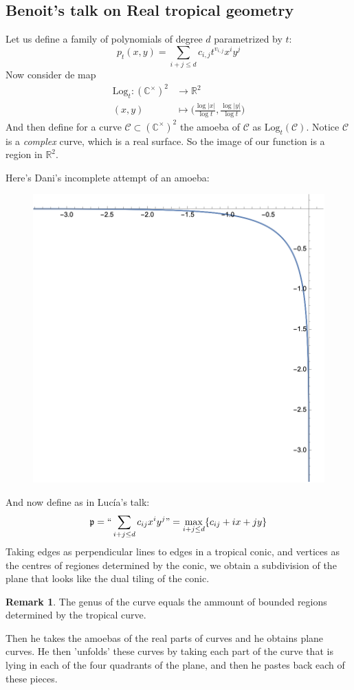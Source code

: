\documentclass{article}
\theoremstyle{definition}
\newtheorem*{obs}{Remark}
\newcommand{\R}{\mathbb{R}}
\newcommand{\C}{\mathbb{C}}
\newcommand{\Log}{\text{Log}}
\begin{document}
\newpage
\subsection{Benoit's talk on Real tropical geometry}
Let us define a family of polynomials of degree $d$ parametrized by $t$:
$$
p_t(x,y)=\sum_{i+j\leq d}c_{i,j}t^{v_{i,j}}x^iy^j
$$
Now consider de map
\begin{align*}
	\Log_t:(\C^\times)^2&\to\R^2\\
	(x,y)&\mapsto \Big(\frac{\log |x|}{\log t},\frac{\log|y|}{\log t}\Big)
\end{align*}
And then define for a curve $\mathcal C\subset(\C^\times)^2$ the amoeba of $\mathcal C$ as $\Log_t(\mathcal C)$. Notice $\mathcal C$ is a \textit{complex} curve, which is a real surface. So the image of our function is a region in $\R^2$.\par
Here's Dani's incomplete attempt of an amoeba:
\begin{figure}[H]
	\centering
	\includegraphics[width=0.5\linewidth]{amoeba1}
	\caption*{}
	\label{fig:amoeba1}
\end{figure}
And now define as in Lucía's talk:
$$
\mathfrak p=``\sum_{i+j\leq d}c_{ij}x^iy^j"=\max_{i+j\leq d}\{c_{ij}+ix+jy\}
$$
Taking edges as perpendicular lines to edges in a tropical conic, and vertices as the centres of regiones determined by the conic, we obtain a subdivision of the plane that looks like the dual tiling of the conic.\par 
\begin{obs} The genus of the curve equals the ammount of bounded regions determined by the tropical curve.
\end{obs}
Then he takes the amoebas of the real parts of curves and he obtains plane curves. He then 'unfolds' these curves by taking each part of the curve that is lying in each of the four quadrants of the plane, and then he pastes back each of these pieces.\par
\end{document}
